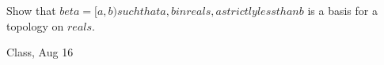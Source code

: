 \begin{samepage}
\begin{ex}
Show that $beta = {{ [a, b) such that a, b in reals, a strictly less than b }}$ is a basis for a topology on $reals$.
\end{ex}
\begin{source}
Class, Aug 16
\end{source}
\end{samepage}
